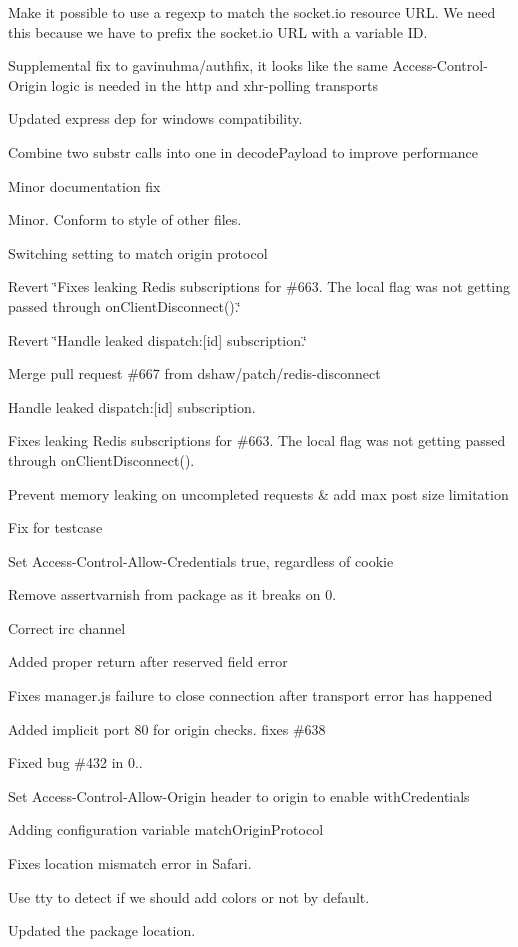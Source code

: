 \begin{DoxyItemize}
\item Make it possible to use a regexp to match the socket.\+io resource U\+RL. We need this because we have to prefix the socket.\+io U\+RL with a variable ID.
\item Supplemental fix to gavinuhma/authfix, it looks like the same Access-\/\+Control-\/\+Origin logic is needed in the http and xhr-\/polling transports
\item Updated express dep for windows compatibility.
\item Combine two substr calls into one in decode\+Payload to improve performance
\item Minor documentation fix
\item Minor. Conform to style of other files.
\item Switching setting to \textquotesingle{}match origin protocol\textquotesingle{}
\item Revert \char`\"{}\+Fixes leaking Redis subscriptions for \#663. The local flag was not getting passed through on\+Client\+Disconnect().\char`\"{}
\item Revert \char`\"{}\+Handle leaked dispatch\+:\mbox{[}id\mbox{]} subscription.\char`\"{}
\item Merge pull request \#667 from dshaw/patch/redis-\/disconnect
\item Handle leaked dispatch\+:\mbox{[}id\mbox{]} subscription.
\item Fixes leaking Redis subscriptions for \#663. The local flag was not getting passed through on\+Client\+Disconnect().
\item Prevent memory leaking on uncompleted requests \& add max post size limitation
\item Fix for testcase
\item Set Access-\/\+Control-\/\+Allow-\/\+Credentials true, regardless of cookie
\item Remove assertvarnish from package as it breaks on 0.
\item Correct irc channel
\item Added proper return after reserved field error
\item Fixes manager.\+js failure to close connection after transport error has happened
\item Added implicit port 80 for origin checks. fixes \#638
\item Fixed bug \#432 in 0..
\item Set Access-\/\+Control-\/\+Allow-\/\+Origin header to origin to enable with\+Credentials
\item Adding configuration variable match\+Origin\+Protocol
\item Fixes location mismatch error in Safari.
\item Use tty to detect if we should add colors or not by default.
\item Updated the package location.
\end{DoxyItemize}

